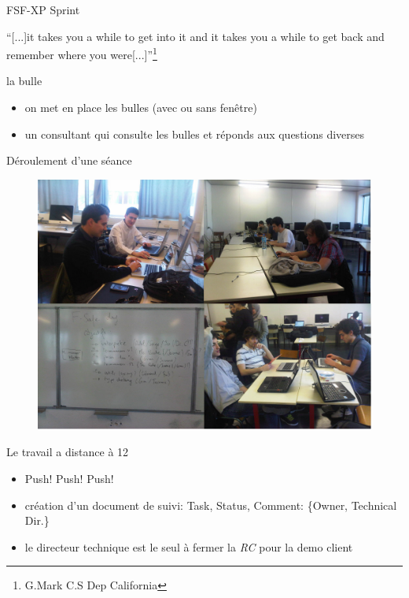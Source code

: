 \begin{frame}{FSF-XP Sprint}
  \begin{block}{}
    ``[...]it takes you a while to get into it and it takes 
    you a while to get back and remember where you were[...]''\footnote{G.Mark C.S Dep California}
  \end{block}
  \begin{block}{la bulle}
    \begin{itemize}
    \item on met en place les bulles (avec ou sans fenêtre)
    \item un consultant qui consulte les bulles et réponds aux questions diverses
    \end{itemize}
  \end{block}
\end{frame}


\begin{frame}{Déroulement d'une séance}
  \begin{figure}
    \includegraphics[scale=0.27]{img/FSafeDay.png}
  \end{figure} 
\end{frame}

\begin{frame}{Le travail a distance à 12}
  \begin{block}{}
    \begin{itemize}
      \item Push! Push! Push!
      \item création d'un document de suivi: Task, Status, Comment: \{Owner, Technical Dir.\}
      \item le directeur technique est le seul à fermer la \emph{RC} pour la demo client
    \end{itemize}
  \end{block}
\end{frame}


